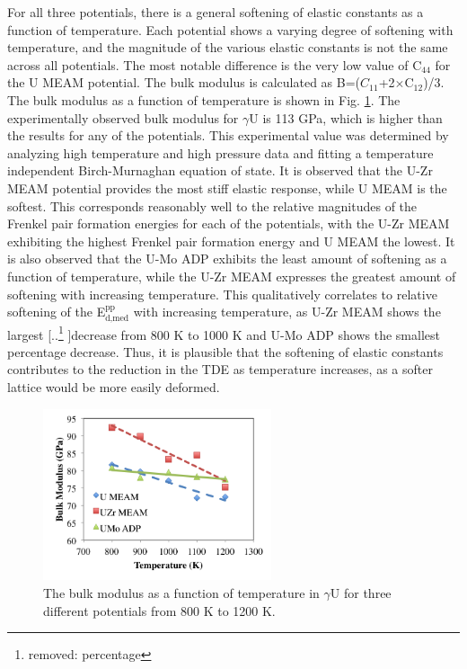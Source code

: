 \documentclass[review]{elsarticle}
\providecommand{\DIFdeltex}[1]{{\protect\color{red} [..\footnote{removed: #1} ]}} %
\providecommand{\DIFdelbegin}{} %
\providecommand{\DIFdelend}{} %
\providecommand{\DIFdel}[1]{\texorpdfstring{\DIFdeltex{#1}}{}} %
\newcommand{\DIFscaledelfig}{0.5}
\newlength{\DIFdelgraphicswidth} %
\newlength{\DIFdelgraphicsheight} %
\newcommand{\DIFdelincludegraphics}[2][]{%
\sbox{\DIFdelgraphicsbox}{\DIFOincludegraphics[#1]{#2}}%
\settoboxwidth{\DIFdelgraphicswidth}{\DIFdelgraphicsbox} %
\settoboxtotalheight{\DIFdelgraphicsheight}{\DIFdelgraphicsbox} %
\scalebox{\DIFscaledelfig}{%
\parbox[b]{\DIFdelgraphicswidth}{\usebox{\DIFdelgraphicsbox}\\[-\baselineskip] \rule{\DIFdelgraphicswidth}{0em}}\llap{\resizebox{\DIFdelgraphicswidth}{\DIFdelgraphicsheight}{%
\setlength{\unitlength}{\DIFdelgraphicswidth}%
\begin{picture}(1,1)%
\thicklines\linethickness{2pt} %
{\color[rgb]{1,0,0}\put(0,0){\framebox(1,1){}}}%
{\color[rgb]{1,0,0}\put(0,0){\line( 1,1){1}}}%
{\color[rgb]{1,0,0}\put(0,1){\line(1,-1){1}}}%
\end{picture}%
}\hspace*{3pt}}} %
} %
\DeclareRobustCommand{\DIFdelbegin}{\DIFOdelbegin \let\includegraphics\DIFdelincludegraphics} %
\DeclareRobustCommand{\DIFdelend}{\DIFOaddend \let\includegraphics\DIFOincludegraphics} %
\begin{document}
\FloatBarrier

For all three potentials, there is a general softening of elastic constants as a function of temperature. Each potential shows a varying degree of softening with temperature, and the magnitude of the various elastic constants is not the same across all potentials. The most notable difference is the very low value of C$_{44}$ for the U MEAM potential. The bulk modulus is calculated as B=($C_{11}$+2$\times$C$_{12}$)/3. The bulk modulus as a function of temperature is shown in Fig. \ref{fig:bulk}. The experimentally observed bulk modulus for $\gamma$U is 113 GPa\cite{yoo1998}, which is higher than the results for any of the potentials. This experimental value was determined by analyzing high temperature and high pressure data and fitting a temperature independent Birch-Murnaghan equation of state. It is observed that the U-Zr MEAM potential provides the most stiff elastic response, while U MEAM is the softest. This corresponds reasonably well to the relative magnitudes of the Frenkel pair formation energies for each of the potentials, with the U-Zr MEAM exhibiting the highest Frenkel pair formation energy and U MEAM the lowest. It is also observed that the U-Mo ADP exhibits the least amount of softening as a function of temperature, while the U-Zr MEAM expresses the greatest amount of softening with increasing temperature. This qualitatively correlates to relative softening of the E$^{\textrm{pp}}_{\textrm{d,med}}$ with increasing temperature, as U-Zr MEAM shows the largest \DIFdelbegin \DIFdel{percentage }\DIFdelend decrease from 800 K to 1000 K and U-Mo ADP shows the smallest percentage decrease. Thus, it is plausible that the softening of elastic constants contributes to the reduction in the TDE as temperature increases, as a softer lattice would be more easily deformed. 

\begin{figure}[h]
 \centering
 \includegraphics[width=0.6\textwidth]{bulk_vs_Tb.png} 
 \caption{The bulk modulus as a function of temperature in $\gamma$U for three different potentials from 800 K to 1200 K.}
 \label{fig:bulk}
\end{figure}
\end{document}

